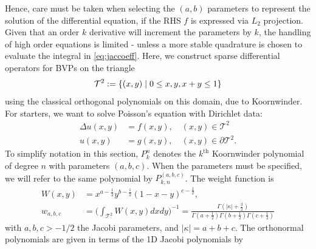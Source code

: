 Hence, care must be taken when selecting the $(a,b)$ parameters to represent the solution of the differential equation, if the RHS $f$ is expressed via $L_2$ projection. Given that an order $k$ derivative will increment the parameters by $k$, the handling of high order equations is limited - unless a more stable quadrature is chosen to evaluate the integral in \eqref{eq:jaccoeff}.
%
\newpage
{}
Here, we construct sparse differential operators for BVPs on the triangle $$\mathcal{T}^2 := \{(x,y)\;|\; 0\leq x,y,x+y\leq 1\}$$ using the classical orthogonal polynomials on this domain, due to Koornwinder. For starters, we want to solve Poisson's equation with Dirichlet data:
\begin{equation}\label{eq:laptri}
	\begin{split}
	\Delta u(x,y) &= f(x,y),\quad (x,y) \in \mathcal{T}^2\\
	u(x,y) &= g(x,y),\quad (x,y) \in \partial\mathcal{T}^2.
	\end{split}
\end{equation}
To simplify notation in this section, $P_k^n$ denotes the $k^{\text{th}}$ Koornwinder polynomial of degree $n$ with parameters $(a,b,c)$. When the parameters must be specified, we will refer to the same polynomial by $P_{k,n}^{(a,b,c)}$. The weight function is
\begin{equation}\label{eq:koornweight}
	\begin{split}
	W(x,y) &= x^{a-\frac{1}{2}}y^{b-\frac{1}{2}}(1-x-y)^{c-\frac{1}{2}},\\
	w_{a,b,c} &= \Big(\int_{\mathcal{T}^2}W(x,y)dxdy\Big)^{-1}=\frac{\Gamma(|\kappa| + \frac{3}{2})}{\Gamma(a+\frac{1}{2})\Gamma(b+\frac{1}{2})\Gamma(c+\frac{1}{2})}
	\end{split}
\end{equation}
with $a,b,c > -1/2$ the Jacobi parameters, and $|\kappa| = a+b+c$. The orthonormal polynomials are given in terms of the 1D Jacobi polynomials by
